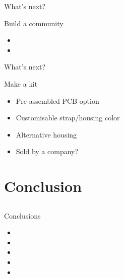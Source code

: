 \documentclass[compress,red]{beamer}
\begin{document}
\begin{frame}{What's next?}

  \begin{block}{Build a community}
    \begin{itemize}
    \item 
    \item 
    \end{itemize}
  \end{block}

  \note[item]{}

\end{frame}

\begin{frame}{What's next?}

  \begin{block}{Make a kit}
    \begin{itemize}
    \item Pre-assembled PCB option
    \item Customisable strap/housing color
    \item Alternative housing
    \item Sold by a company?
    \end{itemize}
  \end{block}

  \note[item]{}

\end{frame}


\section{Conclusion}

\subsection*{} %

\begin{frame}{Conclusions}

  \begin{block}{}
    \begin{itemize}
    \item 
    \item 
    \item 
    \item 
    \item 
    \end{itemize}
  \end{block}

  \note[item]{}

\end{frame}


\begin{comment}
\end{comment}
\end{document}
